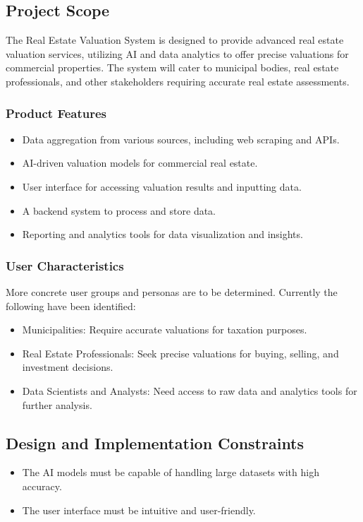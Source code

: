 \documentclass[12pt]{article}
\begin{document}
\subsection{Project Scope}
The Real Estate Valuation System is designed to provide advanced real estate valuation services, utilizing AI and data analytics to offer precise valuations for commercial properties. The system will cater to municipal bodies, real estate professionals, and other stakeholders requiring accurate real estate assessments.

\subsubsection{Product Features}
\begin{itemize}
    \item Data aggregation from various sources, including web scraping and APIs.
    \item AI-driven valuation models for commercial real estate.
    \item User interface for accessing valuation results and inputting data.
    \item A backend system to process and store data.
    \item Reporting and analytics tools for data visualization and insights.
\end{itemize}

\subsubsection{User Characteristics}
More concrete user groups and personas are to be determined. Currently the following have been identified:
\begin{itemize}
    \item Municipalities: Require accurate valuations for taxation purposes.
    \item Real Estate Professionals: Seek precise valuations for buying, selling, and investment decisions.
    \item Data Scientists and Analysts: Need access to raw data and analytics tools for further analysis.
\end{itemize}

\subsection{Design and Implementation Constraints}
\begin{itemize}
    \item The AI models must be capable of handling large datasets with high accuracy.
    \item The user interface must be intuitive and user-friendly.
\end{itemize}
\end{document}
